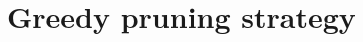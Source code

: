 \documentclass[preprint,10pt]{elsarticle}  %
\newcommand{\PROMPT}[1]{ }
\begin{document}
%
%
%

\section{Greedy pruning strategy}
\label{sec:Greedy}
% 
\end{document}
